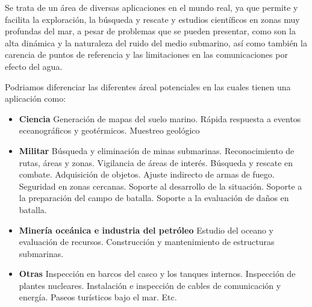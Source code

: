 Se trata de un área de diversas aplicaciones en el mundo real, ya que permite y facilita la exploración, la búsqueda y rescate y estudios científicos en zonas muy profundas del mar, a pesar de problemas que se pueden presentar, como son la alta dinámica y la naturaleza del ruido del medio submarino, así como también la carencia de puntos de referencia y las limitaciones en las comunicaciones por efecto del agua.

Podriamos diferenciar las diferentes áreal potenciales en las cuales tienen una aplicación como:

  \begin{itemize}
  \item \textbf{Ciencia}
    \subitem Generación de mapas del suelo marino.
    \subitem Rápida respuesta a eventos eceanográficos y geotérmicos.
    \subitem Muestreo geológico
  \item \textbf{Militar}
   \subitem Búsqueda y eliminación de minas submarinas. 
   \subitem Reconocimiento de rutas, áreas y zonas. 
   \subitem Vigilancia de áreas de interés. 
   \subitem Búsqueda y rescate en combate. 
   \subitem Adquisición de objetos. 
   \subitem Ajuste indirecto de armas de fuego. 
   \subitem Seguridad en zonas cercanas. 
   \subitem Soporte al desarrollo de la situación. 
   \subitem Soporte a la preparación del campo de batalla. 
   \subitem Soporte a la evaluación de daños en batalla.
  \item \textbf{Minería oceánica e industria del petróleo}
    \subitem Estudio del oceano y evaluación de recursos.
    \subitem Construcción y mantenimiento de estructuras submarinas.
  \item \textbf{Otras}
    \subitem Inspección en barcos del casco y los tanques internos.
    \subitem Inspección de plantes nucleares.
    \subitem Instalación e inspección de cables de comunicación y energía. 
    \subitem Paseos turísticos bajo el mar.
    \subitem Etc.
 \end{itemize}

